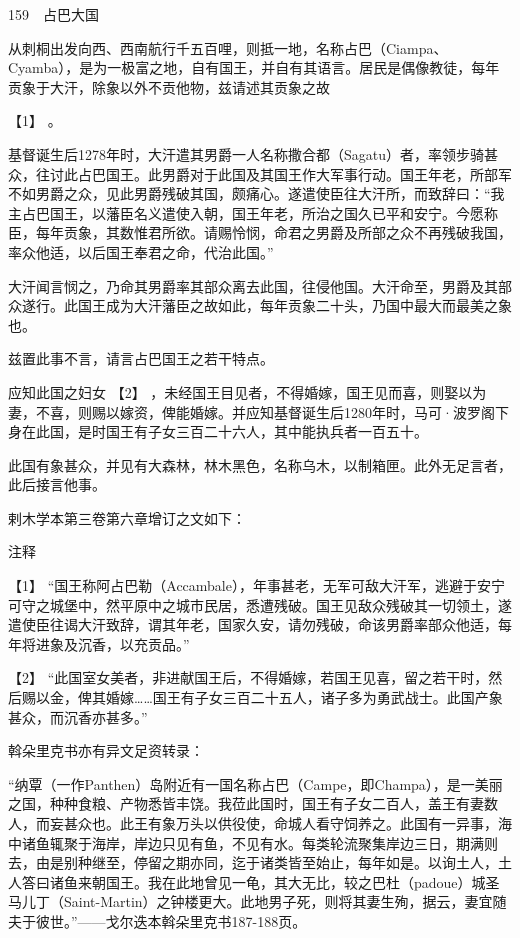 \documentclass[12pt,UTF8]{ctexbook}
\begin{document}
159　占巴大国

从刺桐出发向西、西南航行千五百哩，则抵一地，名称占巴（Ciampa、Cyamba），是为一极富之地，自有国王，并自有其语言。居民是偶像教徒，每年贡象于大汗，除象以外不贡他物，兹请述其贡象之故





【1】 。

基督诞生后1278年时，大汗遣其男爵一人名称撒合都（Sagatu）者，率领步骑甚众，往讨此占巴国王。此男爵对于此国及其国王作大军事行动。国王年老，所部军不如男爵之众，见此男爵残破其国，颇痛心。遂遣使臣往大汗所，而致辞曰：“我主占巴国王，以藩臣名义遣使入朝，国王年老，所治之国久已平和安宁。今愿称臣，每年贡象，其数惟君所欲。请赐怜悯，命君之男爵及所部之众不再残破我国，率众他适，以后国王奉君之命，代治此国。”

大汗闻言悯之，乃命其男爵率其部众离去此国，往侵他国。大汗命至，男爵及其部众遂行。此国王成为大汗藩臣之故如此，每年贡象二十头，乃国中最大而最美之象也。

兹置此事不言，请言占巴国王之若干特点。

应知此国之妇女 【2】 ，未经国王目见者，不得婚嫁，国王见而喜，则娶以为妻，不喜，则赐以嫁资，俾能婚嫁。并应知基督诞生后1280年时，马可·波罗阁下身在此国，是时国王有子女三百二十六人，其中能执兵者一百五十。

此国有象甚众，并见有大森林，林木黑色，名称乌木，以制箱匣。此外无足言者，此后接言他事。

剌木学本第三卷第六章增订之文如下：

注释

【1】 “国王称阿占巴勒（Accambale），年事甚老，无军可敌大汗军，逃避于安宁可守之城堡中，然平原中之城市民居，悉遭残破。国王见敌众残破其一切领土，遂遣使臣往谒大汗致辞，谓其年老，国家久安，请勿残破，命该男爵率部众他适，每年将进象及沉香，以充贡品。”

【2】 “此国室女美者，非进献国王后，不得婚嫁，若国王见喜，留之若干时，然后赐以金，俾其婚嫁……国王有子女三百二十五人，诸子多为勇武战士。此国产象甚众，而沉香亦甚多。”

斡朵里克书亦有异文足资转录：

“纳覃（一作Panthen）岛附近有一国名称占巴（Campe，即Champa），是一美丽之国，种种食粮、产物悉皆丰饶。我莅此国时，国王有子女二百人，盖王有妻数人，而妄甚众也。此王有象万头以供役使，命城人看守饲养之。此国有一异事，海中诸鱼辄聚于海岸，岸边只见有鱼，不见有水。每类轮流聚集岸边三日，期满则去，由是别种继至，停留之期亦同，迄于诸类皆至始止，每年如是。以询土人，土人答曰诸鱼来朝国王。我在此地曾见一龟，其大无比，较之巴杜（padoue）城圣马儿丁（Saint-Martin）之钟楼更大。此地男子死，则将其妻生殉，据云，妻宜随夫于彼世。”——戈尔迭本斡朵里克书187-188页。
\end{document}

